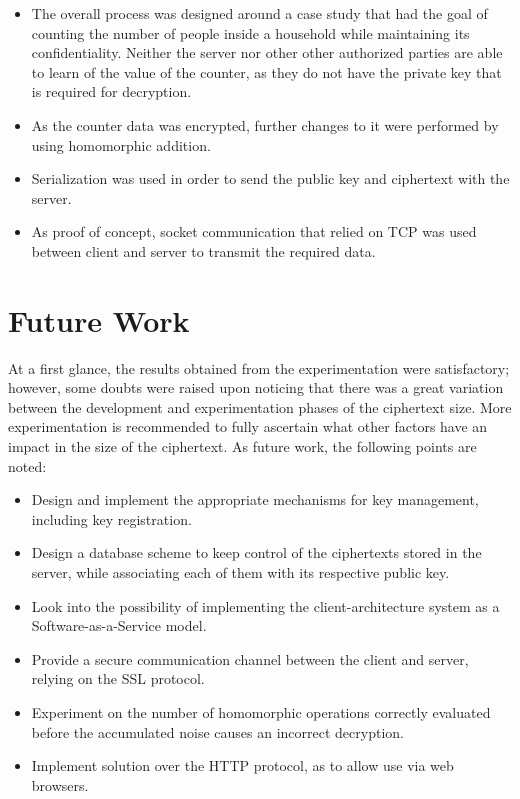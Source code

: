 \begin{itemize}
\item The overall process was designed around a case study that had the goal of counting the number of people inside a household while maintaining its confidentiality. Neither the server nor other other authorized parties are able to learn of the value of the counter, as they do not have the private key that is required for decryption.
\item As the counter data was encrypted, further changes to it were performed by using homomorphic addition. 
\item Serialization was used in order to send the public key and ciphertext with the server.
\item As proof of concept, socket communication that relied on TCP was used between client and server to transmit the required data.
\end{itemize} 

\section{Future Work}
At a first glance, the results obtained from the experimentation were satisfactory; however, some doubts were raised upon noticing that there was a great variation between the development and experimentation phases of the ciphertext size. More experimentation is recommended to fully ascertain what other factors have an impact in the size of the ciphertext. As future work, the following points are noted:

\begin{itemize}
\item Design and implement the appropriate mechanisms for key management, including key registration.
\item Design a database scheme to keep control of the ciphertexts stored in the server, while associating each of them with its respective public key.
\item Look into the possibility of implementing the client-architecture system as a Software-as-a-Service model.
\item Provide a secure communication channel between the client and server, relying on the SSL protocol.
\item Experiment on the number of homomorphic operations correctly evaluated before the accumulated noise causes an incorrect decryption.
\item Implement solution over the HTTP protocol, as to allow use via web browsers.
\end{itemize}

\clearpage
